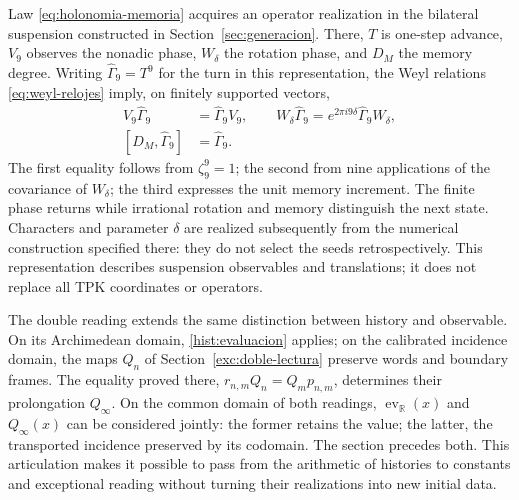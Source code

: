 Law \eqref{eq:holonomia-memoria} acquires an operator realization
in the bilateral suspension constructed in Section~\ref{sec:generacion}.
There, \(T\) is one-step advance, \(V_9\) observes the nonadic phase,
\(W_\delta\) the rotation phase, and \(D_M\) the memory degree.
Writing \(\widehat\Gamma_9=T^9\) for the turn in this representation,
the Weyl relations \eqref{eq:weyl-relojes} imply, on finitely
supported vectors,
\begin{equation}
 \begin{aligned}
 V_9\widehat\Gamma_9&=\widehat\Gamma_9V_9,\qquad
 W_\delta\widehat\Gamma_9=e^{2\pi i9\delta}
     \widehat\Gamma_9W_\delta,\\
 [D_M,\widehat\Gamma_9]&=\widehat\Gamma_9.
 \end{aligned}
 \label{hist:tres-retornos}
\end{equation}
The first equality follows from \(\zeta_9^9=1\); the second from
nine applications of the covariance of \(W_\delta\); the third
expresses the unit memory increment. The finite phase returns while
irrational rotation and memory distinguish the next state. Characters
and parameter \(\delta\) are realized subsequently from the numerical
construction specified there: they do not select the seeds retrospectively.
This representation describes suspension observables and translations;
it does not replace all TPK coordinates or operators.

The double reading extends the same distinction between history and observable.
On its Archimedean domain, \eqref{hist:evaluacion} applies; on the
calibrated incidence domain, the maps \(Q_n\) of
Section~\ref{exc:doble-lectura} preserve words and boundary frames.
The equality proved there,
\(r_{n,m}Q_n=Q_mp_{n,m}\), determines their prolongation \(Q_\infty\).
On the common domain of both readings,
\(\operatorname{ev}_{\mathbb R}(x)\) and \(Q_\infty(x)\)
can be considered jointly: the former retains the value; the latter,
the transported incidence preserved by its codomain. The section
precedes both. This articulation makes it possible to pass from the
arithmetic of histories to constants and exceptional reading without
turning their realizations into new initial data.
